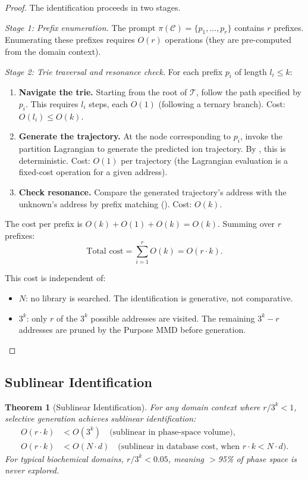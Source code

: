 \documentclass[11pt,twocolumn,a4paper]{article}
\newtheorem{theorem}{Theorem}[section]
\theoremstyle{definition}
\theoremstyle{remark}
\newcommand{\Trie}{\mathcal{T}}
\newcommand{\Context}{\mathcal{C}}
\newcommand{\Prompt}{\pi}
\begin{document}
\begin{proof}
The identification proceeds in two stages.

\textit{Stage 1: Prefix enumeration.} The prompt $\Prompt(\Context) = \{p_1, \ldots, p_r\}$ contains $r$ prefixes. Enumerating these prefixes requires $O(r)$ operations (they are pre-computed from the domain context).

\textit{Stage 2: Trie traversal and resonance check.} For each prefix $p_i$ of length $l_i \leq k$:
\begin{enumerate}[label=(\alph*)]
  \item \textbf{Navigate the trie.} Starting from the root of $\Trie$, follow the path specified by $p_i$. This requires $l_i$ steps, each $O(1)$ (following a ternary branch). Cost: $O(l_i) \leq O(k)$.
  \item \textbf{Generate the trajectory.} At the node corresponding to $p_i$, invoke the partition Lagrangian to generate the predicted ion trajectory. By , this is deterministic. Cost: $O(1)$ per trajectory (the Lagrangian evaluation is a fixed-cost operation for a given address).
  \item \textbf{Check resonance.} Compare the generated trajectory's address with the unknown's address by prefix matching (). Cost: $O(k)$.
\end{enumerate}

The cost per prefix is $O(k) + O(1) + O(k) = O(k)$. Summing over $r$ prefixes:
\begin{equation}
  \text{Total cost} = \sum_{i=1}^{r} O(k) = O(r \cdot k).
\end{equation}

This cost is independent of:
\begin{itemize}
  \item $N$: no library is searched. The identification is generative, not comparative.
  \item $3^k$: only $r$ of the $3^k$ possible addresses are visited. The remaining $3^k - r$ addresses are pruned by the Purpose MMD before generation. \qedhere
\end{itemize}
\end{proof}

\subsection{Sublinear Identification}\label{sec:sublinear}

\begin{theorem}[Sublinear Identification]\label{thm:sublinear}
For any domain context where $r / 3^k < 1$, selective generation achieves sublinear identification:
\begin{align}
  O(r \cdot k) &< O(3^k) \quad \text{(sublinear in phase-space volume)}, \label{eq:sublinear-phase} \\
  O(r \cdot k) &< O(N \cdot d) \quad \text{(sublinear in database cost, when } r \cdot k < N \cdot d\text{)}. \label{eq:sublinear-db}
\end{align}
For typical biochemical domains, $r / 3^k < 0.05$, meaning $>$95\% of phase space is never explored.
\end{theorem}
\end{document}
